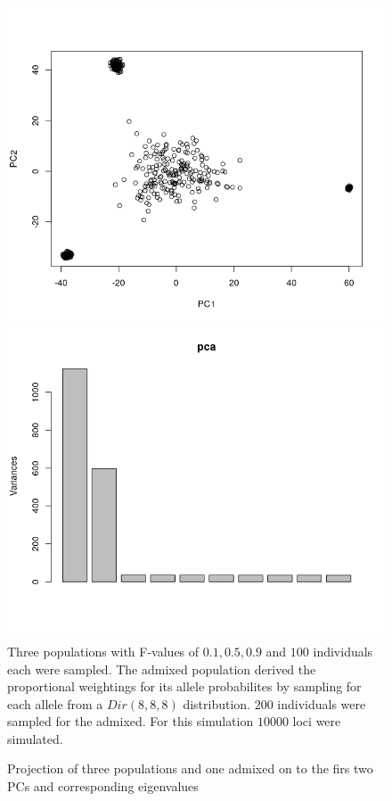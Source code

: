 \documentclass[a4paper, 11pt]{article}
\begin{document}
\begin{figure}[h]
\caption{Projection of three populations and one admixed on to the firs two PCs and corresponding eigenvalues}
\includegraphics[scale=0.5]{Rplot_projection}
\includegraphics[scale=0.5]{Rplot_eigenvalues}
\\Three populations with F-values  of $0.1, 0.5, 0.9$ and $100$ individuals each were sampled. The admixed population derived the proportional weightings for its allele probabilites by sampling for each allele from a $Dir(8, 8, 8)$ distribution. $200$ individuals were sampled for the admixed. For this simulation $10000$ loci were simulated.
\centering
\end{figure}
\end{document}
